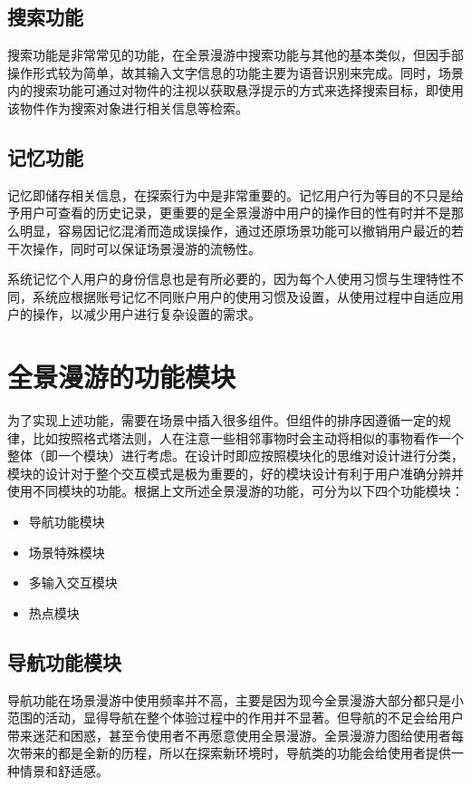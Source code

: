 \subsection{搜索功能}
搜索功能是非常常见的功能，在全景漫游中搜索功能与其他的基本类似，但因手部操作形式较为简单，故其输入文字信息的功能主要为语音识别来完成。同时，场景内的搜索功能可通过对物件的注视以获取悬浮提示的方式来选择搜索目标，即使用该物件作为搜索对象进行相关信息等检索。

\subsection{记忆功能}
记忆即储存相关信息，在探索行为中是非常重要的。记忆用户行为等目的不只是给予用户可查看的历史记录，更重要的是全景漫游中用户的操作目的性有时并不是那么明显，容易因记忆混淆而造成误操作，通过还原场景功能可以撤销用户最近的若干次操作，同时可以保证场景漫游的流畅性。

系统记忆个人用户的身份信息也是有所必要的，因为每个人使用习惯与生理特性不同，系统应根据账号记忆不同账户用户的使用习惯及设置，从使用过程中自适应用户的操作，以减少用户进行复杂设置的需求。


\section{全景漫游的功能模块}
为了实现上述功能，需要在场景中插入很多组件。但组件的排序因遵循一定的规律，比如按照格式塔法则，人在注意一些相邻事物时会主动将相似的事物看作一个整体（即一个模块）进行考虑。在设计时即应按照模块化的思维对设计进行分类，模块的设计对于整个交互模式是极为重要的，好的模块设计有利于用户准确分辨并使用不同模块的功能。根据上文所述全景漫游的功能，可分为以下四个功能模块：
\begin{itemize}
	\item 导航功能模块
	\item 场景特殊模块
	\item 多输入交互模块
	\item 热点模块
\end{itemize}

\subsection{导航功能模块}
导航功能在场景漫游中使用频率并不高，主要是因为现今全景漫游大部分都只是小范围的活动，显得导航在整个体验过程中的作用并不显著。但导航的不足会给用户带来迷茫和困惑，甚至令使用者不再愿意使用全景漫游。全景漫游力图给使用者每次带来的都是全新的历程，所以在探索新环境时，导航类的功能会给使用者提供一种情景和舒适感。

